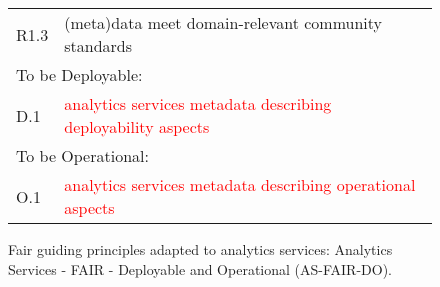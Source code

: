 \begin{figure*}[htb]
{\begin{tabular}{p{1cm}p{12cm}}
R1.3 & (meta)data meet domain-relevant community standards \\
\multicolumn{2}{l}{To be Deployable:}\\
D.1 & \textcolor{red}{analytics services metadata describing deployability aspects} \\
\multicolumn{2}{l}{To be Operational:} \\ 
O.1 & \textcolor{red}{analytics services metadata describing operational aspects} \\ 
\end{tabular}
}
\caption{Fair guiding principles adapted to analytics services:
  Analytics Services - FAIR - Deployable and Operational
  (AS-FAIR-DO).}\label{fig:as-fair-do}
\end{figure*}

